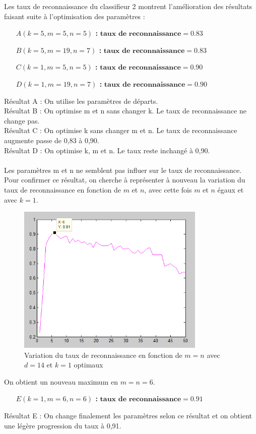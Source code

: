 Les taux de reconnaissance du classifieur 2 montrent l'amélioration des résultats faisant suite à l'optimisation des paramètres :\\

\begin{itemize}
	\item[\textbf{$A(k=5,m=5,n=5)$ : }] $\textbf{taux de reconnaissance} = 0.83$
	\item[\textbf{$B(k=5,m=19,n=7)$ : }] $\textbf{taux de reconnaissance} = 0.83$
	\item[\textbf{$C(k=1,m=5,n=5)$ : }] $\textbf{taux de reconnaissance} = 0.90$
	\item[\textbf{$D(k=1,m=19,n=7)$ : }] $\textbf{taux de reconnaissance} = 0.90$
\end{itemize}

Résultat A : On utilise les paramètres de départs.\\
Résultat B : On optimise m et n sans changer k. Le taux de reconnaissance ne change pas.\\
Résultat C : On optimise k sans changer m et n. Le taux de reconnaissance augmente passe de 0,83 à 0,90.\\
Résultat D : On optimise k, m et n. Le taux reste inchangé à 0,90.\\
\\

Les paramètres m et n ne semblent pas influer sur le taux de reconnaissance. Pour confirmer ce résultat, on cherche à représenter à nouveau la variation du taux de reconnaissance en fonction de $m$ et $n$, avec cette fois $m$ et $n$ égaux et avec $k=1$.

\begin{figure}[h]
	\begin{center}
		\includegraphics[width=0.8\textwidth]{img/33-influence-m=n.png}
	\end{center}
	\caption{Variation du taux de reconnaissance en fonction de $m=n$ avec $d=14$ et $k=1$ optimaux}
	\label{fig:ratemn}
\end{figure}

On obtient un nouveau maximum en $m=n=6$.

\begin{itemize}
	\item[\textbf{$E(k=1,m=6,n=6)$ : }] $\textbf{taux de reconnaissance} = 0.91$
\end{itemize}

Résultat E : On change finalement les paramètres selon ce résultat et on obtient une légère progression du taux à 0,91.